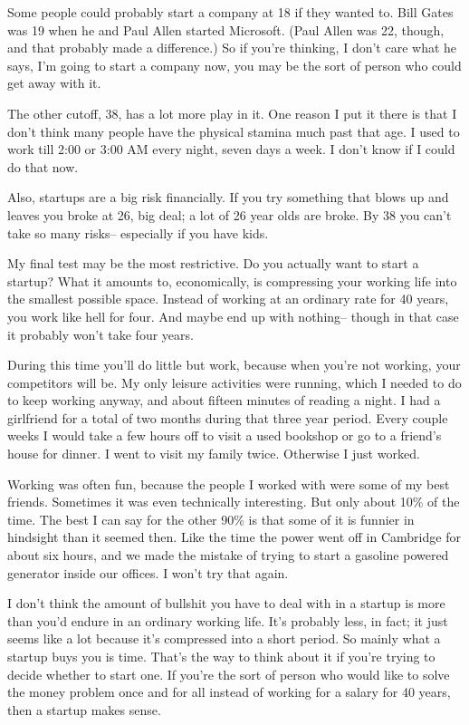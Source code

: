 \documentclass[12pt]{book}
\begin{document}
Some people could probably start a company at 18 if they wanted to. Bill
Gates was 19 when he and Paul Allen started Microsoft. (Paul Allen was
22, though, and that probably made a difference.) So if you're thinking,
I don't care what he says, I'm going to start a company now, you may be
the sort of person who could get away with it.

The other cutoff, 38, has a lot more play in it. One reason I put it
there is that I don't think many people have the physical stamina much
past that age. I used to work till 2:00 or 3:00 AM every night, seven
days a week. I don't know if I could do that now.

Also, startups are a big risk financially. If you try something that
blows up and leaves you broke at 26, big deal; a lot of 26 year olds are
broke. By 38 you can't take so many risks-- especially if you have kids.

My final test may be the most restrictive. Do you actually want to start
a startup? What it amounts to, economically, is compressing your working
life into the smallest possible space. Instead of working at an ordinary
rate for 40 years, you work like hell for four. And maybe end up with
nothing-- though in that case it probably won't take four years.

During this time you'll do little but work, because when you're not
working, your competitors will be. My only leisure activities were
running, which I needed to do to keep working anyway, and about fifteen
minutes of reading a night. I had a girlfriend for a total of two months
during that three year period. Every couple weeks I would take a few
hours off to visit a used bookshop or go to a friend's house for dinner.
I went to visit my family twice. Otherwise I just worked.

Working was often fun, because the people I worked with were some of my
best friends. Sometimes it was even technically interesting. But only
about 10\% of the time. The best I can say for the other 90\% is that
some of it is funnier in hindsight than it seemed then. Like the time
the power went off in Cambridge for about six hours, and we made the
mistake of trying to start a gasoline powered generator inside our
offices. I won't try that again.

I don't think the amount of bullshit you have to deal with in a startup
is more than you'd endure in an ordinary working life. It's probably
less, in fact; it just seems like a lot because it's compressed into a
short period. So mainly what a startup buys you is time. That's the way
to think about it if you're trying to decide whether to start one. If
you're the sort of person who would like to solve the money problem once
and for all instead of working for a salary for 40 years, then a startup
makes sense.
\end{document}
